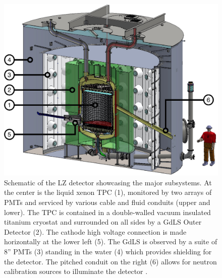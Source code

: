 \begin{figure}[!ht]
    \centering
    \includegraphics[width=\linewidth]{figures/LZ/LZSchematic.pdf}
    \caption{Schematic of the LZ detector showcasing the major subsystems. At the center is the liquid xenon TPC (1), monitored by two arrays of PMTs and serviced by various cable and fluid conduits (upper and lower). The TPC is contained in a double-walled vacuum insulated titanium cryostat and surrounded on all sides by a GdLS Outer Detector (2). The cathode high voltage connection is made horizontally at the lower left (5). The GdLS is observed by a suite of 8” PMTs (3) standing in the water (4) which provides shielding for the detector. The pitched conduit on the right (6) allows for neutron calibration sources to illuminate the detector \cite{LZNIMA}.}
    \label{fig:LZ/LZDetector}
\end{figure}
